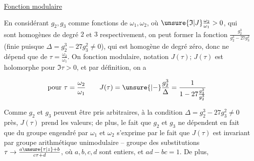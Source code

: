 \uline{Fonction modulaire}

En considérant $g_2,g_3$ comme fonctions de $\omega_1,\omega_2$, où $\unsure{\mathfrak I|J}\frac{\omega_2}{\omega_1}>0$, qui sont homogènes de degré $2$ et $3$ respectivement, on peut former la fonction $\frac{g_2^3}{g_2^3-27g_3^2}$ (finie puisque $\Delta=g_2^3-27g_3^2\ne0$), qui est homogène de degré zéro, donc ne dépend que de $\tau=\frac{\omega_2}{\omega_1}$. On  fonction modulaire, notation $J(\tau)$; $J(\tau)$ est holomorphe pour $\mathfrak I\tau>0$, et par définition, on a

\[
\text{pour }\tau=\frac{\omega_2}{\omega_1}\qquad
J(\tau)=\unsure{{}|-}\frac{g_2^3}{\Delta}=\frac1{1-27\frac{g_3^2}{g_2^3}}
\]

Comme $g_2$ et $g_3$ peuvent être pris arbitraires, à  la condition $\Delta=g_2^3-27g_3^2\ne0$ près, $J(\tau)$ prend  les valeurs; de plus, le fait que $g_2$ et $g_3$ ne dépendent en fait que du groupe engendré par $\omega_1$ et $\omega_2$ s'exprime par le fait que $J(\tau)$ est invariant par   groupe arithmétique unimodulaire -- groupe des substitutions $\tau\to\frac{a\unsure{\tau|z}+b}{c\tau+d}$, où $a,b,c,d$ sont entiers, et $ad-bc=1$. De plus,

